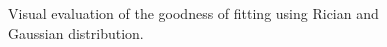 \begin{figure}
  \centering
  \hfill
  \hfill
  \caption{Visual evaluation of the goodness of fitting using Rician and Gaussian distribution.}
  \label{fig:fitting}
\end{figure}



